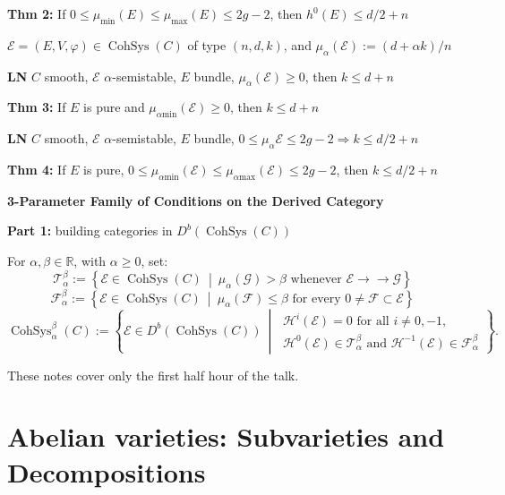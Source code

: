 \medskip\noindent
{\bf Thm 2:}
If
$0\leq\mu_{\min}(E)\leq\mu_{\max}(E)
\leq 2g-2$, then
$h^0(E)\leq d/2+n$

\medskip\noindent
$\mathcal{E}=(E,V,\varphi)
\in\operatorname{CohSys}(C)$ of type
$(n,d,k)$, and
$\mu_\alpha(\mathcal{E})
:=(d+\alpha k)/n$

\medskip\noindent
{\bf LN}
$C$ smooth, $\mathcal{E}$
$\alpha$-semistable, $E$ bundle,
$\mu_\alpha(\mathcal{E})\geq 0$, then
$k\leq d+n$

\medskip\noindent
{\bf Thm 3:}
If $E$ is pure and
$\mu_{\alpha\mathrm{min}}(\mathcal{E})
\geq 0$, then
$k\leq d+n$

\medskip\noindent
{\bf LN}
$C$ smooth, $\mathcal{E}$
$\alpha$-semistable, $E$ bundle,
$0\leq\mu_\alpha\mathcal{E}\leq 2g-2
\Rightarrow k\leq d/2+n$

\medskip\noindent
{\bf Thm 4:}
If $E$ is pure,
$0\leq
\mu_{\alpha\mathrm{min}}(\mathcal{E})
\leq
\mu_{\alpha\mathrm{max}}(\mathcal{E})
\leq 2g-2$, then
$k\leq d/2+n$

\medskip\noindent
{\bf 3-Parameter Family of Conditions on
the Derived Category}

\medskip\noindent
{\bf Part 1:} building categories in
$D^b(\operatorname{CohSys}(C))$

For $\alpha,\beta\in\mathbb{R}$, with
$\alpha\geq 0$, set:
$$
\mathcal{T}_\alpha^\beta
:=
\left\{
\mathcal{E}\in\operatorname{CohSys}(C)
\ \middle|\
\mu_\alpha(\mathcal{G})>\beta
\text{ whenever }
\mathcal{E}\to\!\!\!\!\!\to\mathcal{G}
\right\}
$$
$$
\mathcal{F}_\alpha^\beta
:=
\left\{
\mathcal{E}\in\operatorname{CohSys}(C)
\ \middle|\
\mu_\alpha(\mathcal{F})\leq\beta
\text{ for every }
0\neq\mathcal{F}\subset\mathcal{E}
\right\}
$$
$$
\operatorname{CohSys}_\alpha^\beta(C)
:=
\left\{
\mathcal{E}\in
D^b(\operatorname{CohSys}(C))
\ \middle|\
\begin{array}{l}
\mathcal{H}^i(\mathcal{E})=0
\text{ for all }i\neq 0,-1,\\
\mathcal{H}^0(\mathcal{E})
\in\mathcal{T}_\alpha^\beta
\text{ and }
\mathcal{H}^{-1}(\mathcal{E})
\in\mathcal{F}_\alpha^\beta
\end{array}
\right\}.
$$

These notes cover only the first half hour
of the talk.


\section{Abelian varieties: Subvarieties and
Decompositions}
\label{section-abelian-varieties-subvarieties-decompositions}

